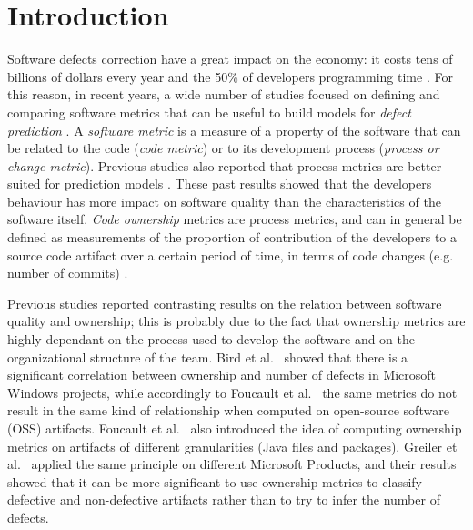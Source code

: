 \section{Introduction}
\label{sec:introduction}
Software defects correction have a great impact on the economy: it costs tens of billions of dollars every year and the 50\% of developers programming time \cite{DefectsCost, DefectsCost2}. For this reason, in recent years, a wide number of studies focused on defining and comparing software metrics that can be useful to build models for \textit{defect prediction} \cite{bird:original, Rahman:blame, Greiler:replication, Rahman:2013, moser2008comparative, zimmermann2009cross-project}. A \textit{software metric} is a measure of a property of the software that can be related to the code (\textit{code metric}) or to its development process (\textit{process or change metric}). Previous studies also reported that process metrics are better-suited for prediction models \cite{moser2008comparative, Rahman:2013}. These past results showed that the developers behaviour has more impact on software quality than the characteristics of the software itself. \textit{Code ownership} metrics are process metrics, and can in general be defined as measurements of the proportion of contribution of the developers to a source code artifact over a certain period of time, in terms of code changes (e.g. number of commits) \cite{Greiler:replication}.

Previous studies reported contrasting results on the relation between software quality and ownership; this is probably due to the fact that ownership metrics are highly dependant on the process used to develop the software and on the organizational structure of the team. Bird et al.~\cite{bird:original} showed that there is a significant correlation between ownership and number of defects in Microsoft Windows projects, while accordingly to Foucault et al.~\cite{Foucault:oss} the same metrics do not result in the same kind of relationship when computed on open-source software (OSS) artifacts. Foucault et al.~\cite{Foucault:oss} also introduced the idea of computing ownership metrics on artifacts of different granularities (Java files and packages). Greiler et al.~\cite{Greiler:replication} applied the same principle on different Microsoft Products, and their results showed that it can be more significant to use ownership metrics to classify defective and non-defective artifacts rather than to try to infer the number of defects. 


